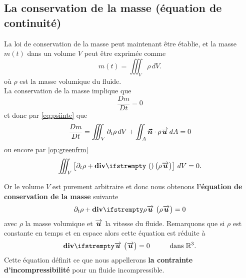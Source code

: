 \subsection{La conservation de la masse (équation de continuité)}
\noindent La loi de conservation de la masse peut maintenant être établie, et la masse $m(t)$ dans un volume $V$ peut être exprimée comme
\begin{equation}
	m(t) = \iiint_V \rho\, d V.
\end{equation} 
où $\rho$ est la masse volumique du fluide.\\
La conservation de la masse implique que \[ \frac{D m}{D t} = 0\]
et donc par \eqref{eq:psiinte} que 
\begin{equation}
	\frac{D m}{D t} = \iiint_V \partial_t \rho\, d V + \iint_A \boldsymbol{\vec{n}} \cdot \rho \overrightarrow{\boldsymbol{u}}\, d A = 0
\end{equation}
ou encore par \eqref{op:greenfrm}
\begin{equation}
	\iiint_V \left[\partial_t \rho + \div\left(\rho \velocity\right)\right]\,d V = 0.
\end{equation}
\begin{refe}
Or le volume $V$ est purement arbitraire et donc nous obtenons \textbf{l'équation de conservation de la masse} suivante
\begin{equation}
	\partial_t \rho + \div[\rho \velocity]= 0\label{eq:consmass}
\end{equation}
avec $\rho$ la masse volumique et $\overrightarrow{\boldsymbol{u}}$ la vitesse du fluide. Remarquons que si $\rho$ est constante en temps et en espace alors cette équation est réduite à
\begin{equation}
	\div[\velocity] = 0 \hspace{1cm}\text{dans $\mathbb{R}^3$}.\label{eq:incompressible}
\end{equation}
Cette équation définit ce que nous appellerons \textbf{la contrainte d'incompressibilité} pour un fluide incompressible.
\end{refe}

